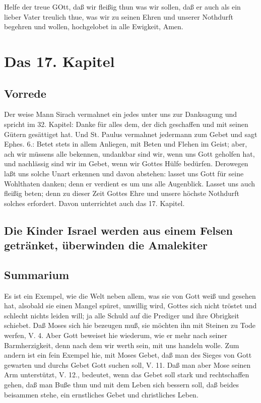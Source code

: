 Helfe der treue GOtt, daß wir fleißig thun was wir sollen, daß er auch als ein lieber Vater treulich thue, was wir zu seinen Ehren und unserer Nothdurft begehren und wollen, hochgelobet in alle Ewigkeit, Amen.

\chapter{Das 17. Kapitel}

\section{Vorrede}

Der weise Mann Sirach vermahnet ein jedes unter uns zur Danksagung und spricht im 32. Kapitel: Danke für alles dem, der dich geschaffen und mit seinen Gütern gesättiget hat. Und St. Paulus vermahnet jedermann zum Gebet und sagt Ephes. 6.: Betet stets in allem Anliegen, mit Beten und Flehen im Geist; aber, ach wir müssens alle bekennen, undankbar sind wir, wenn uns Gott geholfen hat, und nachlässig sind wir im Gebet, wenn wir Gottes Hülfe bedürfen. Derowegen laßt uns solche Unart erkennen und davon abstehen: lasset uns Gott für seine Wohlthaten danken; denn er verdient es um uns alle Augenblick. Lasset uns auch fleißig beten; denn zu dieser Zeit Gottes Ehre und unsere höchste Nothdurft solches erfordert. Davon unterrichtet auch das 17. Kapitel.

\section[Die Kinder Israel werden aus einem Felsen getränket,]{Die Kinder Israel werden aus einem Felsen getränket, überwinden die Amalekiter}




\section{Summarium}

Es ist ein Exempel, wie die Welt neben allem, was sie von Gott weiß und gesehen hat, alsobald sie einen Mangel spüret, unwillig wird, Gottes sich nicht tröstet und schlecht nichts leiden will; ja alle Schuld auf die Prediger und ihre Obrigkeit schiebet. Daß Moses sich hie bezeugen muß, sie möchten ihn mit Steinen zu Tode werfen, V. 4. Aber Gott beweiset hie wiederum, wie er mehr nach seiner Barmherzigkeit, denn nach dem wir werth sein, mit uns handeln wolle.
Zum andern ist ein fein Exempel hie, mit Moses Gebet, daß man des Sieges von Gott gewarten und durchs Gebet Gott suchen soll, V. 11. Daß man aber Mose seinen Arm unterstützt, V. 12., bedeutet, wenn das Gebet soll stark und rechtschaffen gehen, daß man Buße thun und mit dem Leben sich bessern soll, daß beides beisammen stehe, ein ernstliches Gebet und christliches Leben.

